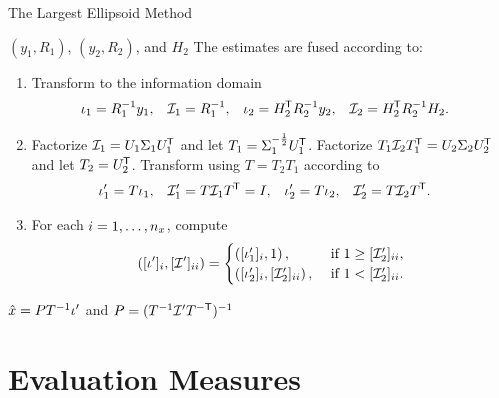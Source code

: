 \begin{algorithm}[tb]
	\caption{The Largest Ellipsoid Method}
	\label{alg:le}
	\begin{small}
	\begin{algorithmic}[0]
		\Input $(y_1,R_1)$, $(y_2,R_2)$, and $H_2$
		\State The estimates are fused according to:
		\begin{enumerate}
			\item Transform to the information domain
			\begin{align*}
				\iota_1 &= R_1^{-1} y_1, & \mathcal{I}_1 &= R_1^{-1}, &
				\iota_2 &= H_2^{\mkern-1.5mu\mathsf{T}} R_2^{-1} y_2, & \mathcal{I}_2 &= H_2^{\mkern-1.5mu\mathsf{T}} R_2^{-1} H_2.
			\end{align*}
			\item Factorize $\mathcal{I}_1=U_1\Sigma_1U_1^{\mkern-1.5mu\mathsf{T}}$ and let $T_1=\Sigma_1^{-\frac{1}{2}} U_1^{\mkern-1.5mu\mathsf{T}}$. Factorize $T_1\mathcal{I}_2T_1^{\mkern-1.5mu\mathsf{T}}=U_2\Sigma_2U_2^{\mkern-1.5mu\mathsf{T}}$ and let $T_2=U_2^{\mkern-1.5mu\mathsf{T}}$. Transform using $T=T_2T_1$ according to
				\begin{align*}
					 \iota_1' &= T\iota_1, & \mathcal{I}_1'&= T \mathcal{I}_1 T^{\mkern-1.5mu\mathsf{T}}=I, &
					 \iota_2' &= T\iota_2, & \mathcal{I}_2'&= T \mathcal{I}_2 T^{\mkern-1.5mu\mathsf{T}}.
				\end{align*}
			\item For each $i=1,\dots,n_x$, compute
				\begin{equation*}
					\left([\iota']_i,[\mathcal{I}']_{ii}\right) = 
						\begin{cases}
        					\left([\iota_1']_i,1\right), & \text{ if } 1 \geq [\mathcal{I}_2']_{ii},\\
        					\left([\iota_2']_i,[\mathcal{I}_2']_{ii}\right), & \text{ if } 1 < [\mathcal{I}_2']_{ii}.
    					\end{cases} 
				\end{equation*} 	
		\end{enumerate}
		\Output $\hat{x}=PT^{-1}\iota'$ and $P=(T^{-1}\mathcal{I}' T^{-\mathsf{T}})^{-1}$
	\end{algorithmic}
	\end{small}
\end{algorithm}





\section{Evaluation Measures} \label{sec:evaluation-measures}

